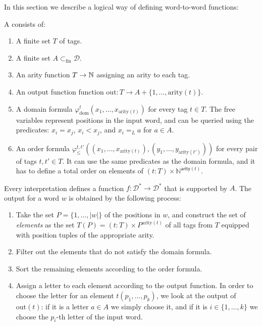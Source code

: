 \AP
In this section we describe a logical way of defining word-to-word functions: 
\begin{definition}
A  consists of:
\begin{enumerate}
\item A finite set $T$ of tags.
\item A finite set $A \subset_{\textrm{fin}}\mathcal{D}$.
\item An arity function $T \to \mathbb{N}$ assigning an arity to each tag.
\item An output function function $\text{out} : T \to A + \{1, \ldots, \text{arity}(t)\}$. 
\item A domain formula $\varphi_{\text{dom}}^t(x_1,\ldots,x_{\text{arity}(t)})$ for every tag $t \in T$.
      The free variables represent positions in the input word, and can be queried using the predicates: 
      $x_i = x_j$, $x_i < x_j$, and $x_i =_L a$ for $a \in A$.
\item An order formula $\varphi_{\leq}^{t,t'}((x_1,\ldots,x_{\text{arity}(t)}),(y_1,\ldots,y_{\text{arity}(t')}))$ for every pair of tags $t,t' \in T$. 
      It can use the same predicates as the domain formula, and it has to define a total order on elements of $(t : T) \times \mathbb{N}^{\mathsf{arity}(t)}$.
\end{enumerate}
\end{definition}

Every interpretation defines a function $f : \mathcal{D}^* \to \mathcal{D}^*$ that is supported by $A$.
The output for a word $w$ is obtained by the following process:
\begin{enumerate}
    \item  Take the set $P = \{1, \ldots, |w|\}$ of the positions in $w$, and construct the set 
           of \emph{elements} as the set $T(P) = (t : T) \times P^{\text{arity}(t)}$
           of all tags from $T$ equipped with position tuples of the appropriate arity.
    \item Filter out the elements that do not satisfy the domain formula.
    \item Sort the remaining elements according to the order formula.
    \item Assign a letter to each element according to the output function.
          In order to choose the letter for an element $t(p_1, \ldots, p_k)$, we look at the 
          output of $\text{out}(t)$: if it is a letter $a \in A$ we simply choose it,
          and if it is $i \in \{1, \ldots, k\}$ we choose the $p_i$-th letter of the input word.
\end{enumerate}


